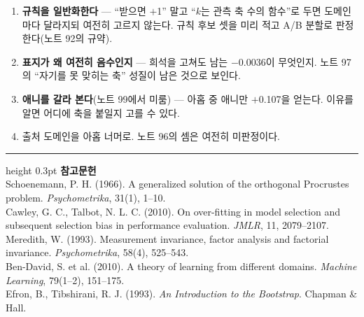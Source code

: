 \documentclass[10pt]{article}
\begin{document}
\begin{enumerate}[leftmargin=1.3em,itemsep=0.15em]
\item \textbf{규칙을 일반화한다} --- ``받으면 $+$1'' 말고 ``$k$는 관측 축
      수의 함수''로 두면 도메인마다 달라지되 여전히 고르지 않는다. 규칙 후보
      셋을 미리 적고 A/B 분할로 판정한다(노트 92의 규약).
\item \textbf{표지가 왜 여전히 음수인지} --- 희석을 고쳐도 남는 $-$0.0036이
      무엇인지. 노트 97의 ``자기를 못 맞히는 축'' 성질이 남은 것으로 보인다.
\item \textbf{애니를 갈라 본다}(노트 99에서 미룸) --- 아홉 중 애니만 $+$0.107을
      얻는다. 이유를 알면 어디에 축을 붙일지 고를 수 있다.
\item 출처 도메인을 아홉 너머로. 노트 96의 셈은 여전히 미판정이다.
\end{enumerate}

\vspace{0.6em}
\hrule height 0.3pt
\vspace{0.5em}
{\footnotesize
\textbf{참고문헌}\\[0.3em]
Schoenemann, P. H. (1966). A generalized solution of the orthogonal Procrustes
problem. \emph{Psychometrika}, 31(1), 1--10.\\[0.15em]
Cawley, G. C., Talbot, N. L. C. (2010). On over-fitting in model selection and
subsequent selection bias in performance evaluation. \emph{JMLR}, 11, 2079--2107.\\[0.15em]
Meredith, W. (1993). Measurement invariance, factor analysis and factorial
invariance. \emph{Psychometrika}, 58(4), 525--543.\\[0.15em]
Ben-David, S. et al. (2010). A theory of learning from different domains.
\emph{Machine Learning}, 79(1--2), 151--175.\\[0.15em]
Efron, B., Tibshirani, R. J. (1993). \emph{An Introduction to the Bootstrap}.
Chapman \& Hall.
}
\end{document}
